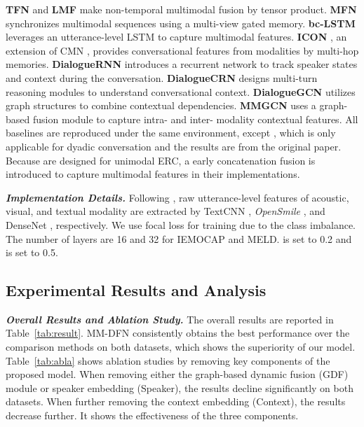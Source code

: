 \documentclass{article}
\begin{document}
\textbf{TFN} \cite{DBLP:conf/emnlp/ZadehCPCM17} and \textbf{LMF} \cite{DBLP:conf/acl/MorencyLZLSL18} 
make non-temporal multimodal fusion by tensor product.
\textbf{MFN} \cite{DBLP:conf/aaai/ZadehLMPCM18} synchronizes multimodal sequences using a multi-view gated memory.
\textbf{bc-LSTM} \cite{DBLP:conf/acl/PoriaCHMZM17} leverages an utterance-level LSTM to capture multimodal features. \textbf{ICON} \cite{DBLP:conf/emnlp/HazarikaPMCZ18}, an extension of CMN \cite{DBLP:conf/naacl/HazarikaPZCMZ18}, provides conversational features from modalities by multi-hop memories.
\textbf{DialogueRNN} \cite{DBLP:conf/aaai/MajumderPHMGC19}  
introduces a recurrent network to track speaker states and context during the conversation.
\textbf{DialogueCRN} \cite{DBLP:conf/acl/HuWH20} designs multi-turn reasoning modules to understand conversational context. \textbf{DialogueGCN} \cite{DBLP:conf/emnlp/GhosalMPCG19} utilizes graph structures to combine contextual dependencies.
\textbf{MMGCN} \cite{DBLP:conf/acl/HuLZJ20} uses a graph-based fusion module to capture intra- and inter- modality contextual features.
All baselines are reproduced under the same environment, except \cite{DBLP:conf/emnlp/HazarikaPMCZ18}, which is only applicable for dyadic conversation and the results are from the original paper. Because \cite{DBLP:conf/aaai/MajumderPHMGC19,DBLP:conf/emnlp/GhosalMPCG19,DBLP:conf/acl/HuWH20} are designed for unimodal ERC, 
a early concatenation fusion is introduced to capture multimodal features in their implementations. 

  






\textit{\textbf{Implementation Details.}}
Following \cite{DBLP:conf/acl/HuLZJ20}, raw utterance-level features of acoustic, visual, and textual modality are extracted by TextCNN \cite{DBLP:conf/emnlp/Kim14}, \textit{OpenSmile}  \cite{DBLP:journals/speech/SchullerBSS11}, and DenseNet \cite{DBLP:conf/cvpr/HuangLMW17}, respectively. We use focal loss \cite{lin2017focal} for training due to the class imbalance. The number of layers  are 16 and 32 for IEMOCAP and MELD. 
 is set to 0.2 and  is set to 0.5. 





\subsection{Experimental Results and Analysis}
\textit{\textbf{Overall Results and Ablation Study.}}
The overall results are reported in Table~\ref{tab:result}.
MM-DFN consistently obtains the best performance over the comparison methods on both datasets, which shows the superiority of our model.
Table~\ref{tab:abla} shows ablation studies by removing key components of the proposed model. When removing either the graph-based dynamic fusion (GDF) module or speaker embedding (Speaker), the results decline significantly on both datasets. 
When further removing the context embedding (Context), the results decrease further. 
It shows the effectiveness of the three components.
\end{document}
